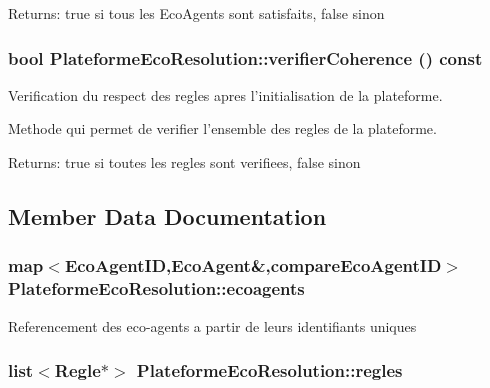 \begin{Desc}
\item[Returns:]true si tous les EcoAgents sont satisfaits, false sinon \end{Desc}
\hypertarget{classPlateformeEcoResolution_0d35ee702a0b255f0da91aa382089865}{
\subsubsection[{verifierCoherence}]{\setlength{\rightskip}{0pt plus 5cm}bool PlateformeEcoResolution::verifierCoherence () const}}
\label{classPlateformeEcoResolution_0d35ee702a0b255f0da91aa382089865}


Verification du respect des regles apres l'initialisation de la plateforme. 

Methode qui permet de verifier l'ensemble des regles de la plateforme.

\begin{Desc}
\item[Returns:]true si toutes les regles sont verifiees, false sinon \end{Desc}


\subsection{Member Data Documentation}
\hypertarget{classPlateformeEcoResolution_02de97d0d9dac3719ceaadfb255492a3}{
\subsubsection[{ecoagents}]{\setlength{\rightskip}{0pt plus 5cm}map$<${\bf EcoAgentID},{\bf EcoAgent}\&,{\bf compareEcoAgentID}$>$ {\bf PlateformeEcoResolution::ecoagents}}}
\label{classPlateformeEcoResolution_02de97d0d9dac3719ceaadfb255492a3}


Referencement des eco-agents a partir de leurs identifiants uniques \hypertarget{classPlateformeEcoResolution_4f7dc37edf042a189073f15771604e35}{
\subsubsection[{regles}]{\setlength{\rightskip}{0pt plus 5cm}list$<${\bf Regle}$\ast$$>$ {\bf PlateformeEcoResolution::regles}}}
\label{classPlateformeEcoResolution_4f7dc37edf042a189073f15771604e35}


